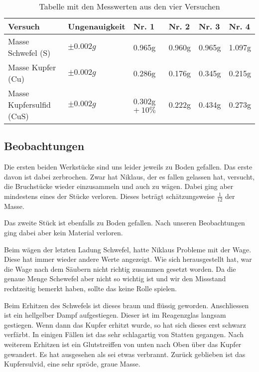 \documentclass[11pt,paper=a4,final]{scrartcl}
\begin{document}
{
\begin{table}[h!]
\centering
  \begin{tabular}{|l|l|l|l|l|l|}
    \hline
    \bf Versuch			& \bf Ungenauigkeit	& \bf Nr. 1	& \bf Nr. 2	& \bf Nr. 3	& \bf Nr. 4	\\ \hline
    Masse Schwefel (S) 		& \( \pm 0.002g \)	& 0.965g	&	0.960g & 0.965g & 1.097g \\ \hline
    Masse Kupfer (Cu)		& \( \pm 0.002g \)	& 0.286g	&	0.176g & 0.345g & 0.215g \\ \hline
    Masse Kupfersulfid (CuS)	& \( \pm 0.002g \)	& 0.302g \(+ ~ 10\% \)       & 	0.222g & 0.434g & 0.273g \\ \hline
  \end{tabular}
  \caption{Tabelle mit den Messwerten aus den vier Versuchen}
  \label{tab:messwerte}
\end{table}
\subsection{Beobachtungen}
Die ersten beiden Werkst\"ucke sind uns leider jeweils zu Boden gefallen. Das
erste davon ist dabei zerbrochen. Zwar hat Niklaus, der es fallen gelassen hat,
versucht, die Bruchst\"ucke wieder einzusammeln und auch zu w\"agen. Dabei ging
aber mindestens eines der St\"ucke verloren. Dieses betr\"agt sch\"atzungsweise
\( \frac{1}{12} \) der Masse.

Das zweite St\"uck ist ebenfalls zu Boden gefallen. Nach unseren Beobachtungen
ging dabei aber kein Material verloren.

Beim w\"agen der letzten Ladung Schwefel, hatte Niklaus Probleme mit der Wage.
Diese hat immer wieder andere Werte angezeigt. Wie sich herausgestellt hat, war
die Wage nach dem S\"aubern nicht richtig zusammen gesetzt worden. Da die genaue
Menge Schewefel aber nicht so wichtig ist und wir den Missstand rechtzeitig
bemerkt haben, sollte das keine Rolle spielen.

Beim Erhitzen des Schwefels ist dieses braun und fl\"ussig geworden.
Anschliessen ist ein hellgelber Dampf aufgestiegen. Dieser ist im Reagenzglas
langsam gestiegen. Wenn dann das Kupfer erhitzt wurde, so hat sich dieses erst
schwarz verf\"arbt. In einigen F\"allen ist das sehr schlagartig von Statten
gegangen. Nach weiterem Erhitzen ist ein Glutstreiffen von unten nach
Oben \"uber das Kupfer gewandert. Es hat ausgesehen als sei etwas verbrannt.
Zur\"uck geblieben ist das Kupfersulvid, eine sehr spr\"ode, graue Masse.

}
\end{document}
